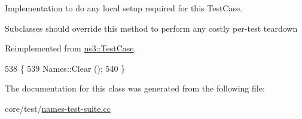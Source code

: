 Implementation to do any local setup required for this Test\+Case. 

Subclasses should override this method to perform any costly per-\/test teardown 

Reimplemented from \hyperlink{classns3_1_1TestCase_a8917f1604e28d312a8086f76291e3c46}{ns3\+::\+Test\+Case}.


\begin{DoxyCode}
538 \{
539   Names::Clear ();
540 \}
\end{DoxyCode}


The documentation for this class was generated from the following file\+:\begin{DoxyCompactItemize}
\item 
core/test/\hyperlink{names-test-suite_8cc}{names-\/test-\/suite.\+cc}\end{DoxyCompactItemize}
